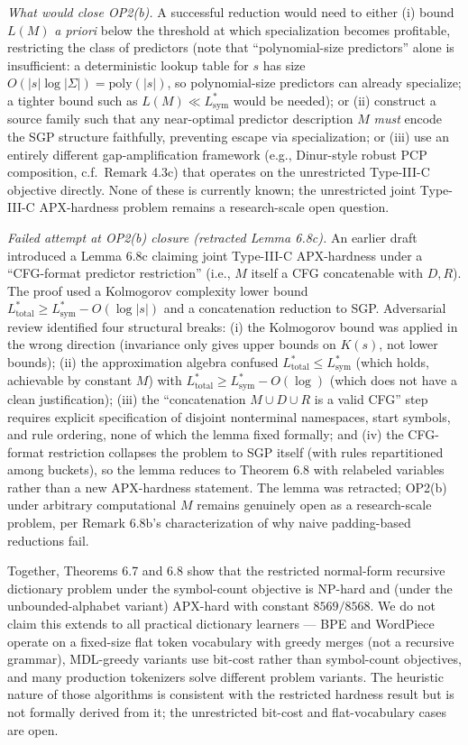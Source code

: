 \documentclass[
]{article}
\begin{document}
\emph{What would close OP2(b).} A successful reduction would need to
either (i) bound $L(M)$ \emph{a priori} below the threshold at which
specialization becomes profitable, restricting the class of
predictors (note that ``polynomial-size predictors'' alone is
insufficient: a deterministic lookup table for $s$ has size
$O(|s| \log |\Sigma|) = \mathrm{poly}(|s|)$, so polynomial-size
predictors can already specialize; a tighter bound such as
$L(M) \ll L_{\mathrm{sym}}^*$ would be needed); or (ii) construct a source family such that any
near-optimal predictor description $M$ \emph{must} encode the SGP
structure faithfully, preventing escape via specialization; or
(iii) use an entirely different gap-amplification framework
(e.g., Dinur-style robust PCP composition, c.f.\ Remark 4.3c) that
operates on the unrestricted Type-III-C objective directly. None of
these is currently known; the unrestricted joint Type-III-C
APX-hardness problem remains a research-scale open question.

\emph{Failed attempt at OP2(b) closure (retracted Lemma 6.8c).}
An earlier draft introduced a Lemma 6.8c claiming joint Type-III-C
APX-hardness under a ``CFG-format predictor restriction'' (i.e., $M$
itself a CFG concatenable with $D, R$). The proof used a Kolmogorov
complexity lower bound $L^*_{\mathrm{total}} \geq L^*_{\mathrm{sym}}
- O(\log |s|)$ and a concatenation reduction to SGP. Adversarial review
identified four structural breaks: (i) the Kolmogorov bound was
applied in the wrong direction (invariance only gives upper bounds on
$K(s)$, not lower bounds); (ii) the approximation algebra confused
$L^*_{\mathrm{total}} \leq L^*_{\mathrm{sym}}$ (which holds, achievable
by constant $M$) with $L^*_{\mathrm{total}} \geq L^*_{\mathrm{sym}}
- O(\log)$ (which does not have a clean justification); (iii) the
``concatenation $M \cup D \cup R$ is a valid CFG'' step requires
explicit specification of disjoint nonterminal namespaces, start
symbols, and rule ordering, none of which the lemma fixed formally;
and (iv) the CFG-format restriction collapses the problem to SGP
itself (with rules repartitioned among buckets), so the lemma reduces
to Theorem 6.8 with relabeled variables rather than a new APX-hardness
statement. The lemma was retracted; OP2(b) under arbitrary
computational $M$ remains genuinely open as a research-scale problem,
per Remark 6.8b's characterization of why naive padding-based
reductions fail.

Together, Theorems 6.7 and 6.8 show that the restricted normal-form
recursive dictionary problem under the symbol-count objective is
NP-hard and (under the unbounded-alphabet variant) APX-hard with
constant $8569/8568$. We do not claim this extends to all
practical dictionary learners --- BPE and WordPiece operate on a
fixed-size flat token vocabulary with greedy merges (not a
recursive grammar), MDL-greedy variants use bit-cost rather than
symbol-count objectives, and many production tokenizers solve
different problem variants. The heuristic nature of those
algorithms is consistent with the restricted hardness result but
is not formally derived from it; the unrestricted bit-cost and
flat-vocabulary cases are open.
\end{document}
